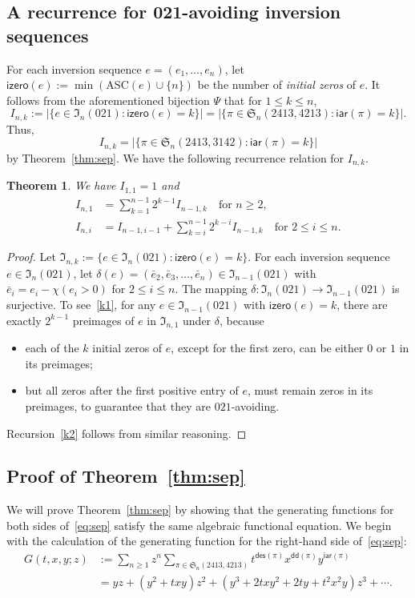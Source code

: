 \documentclass[12pt]{amsart}
\numberwithin{equation}{section}
\theoremstyle{plain}
\newtheorem{theorem}{Theorem}[section]
\theoremstyle{definition}
\newcommand{\I}{\mathfrak{I}}
\def\des{\mathsf{des}}
\def\S{\mathfrak{S}}
\def\iar{\mathsf{iar}}
\def\ASC{\mathrm{ASC}}
\def\dd{\mathsf{dd}}
\def\izero{\mathsf{izero}}
\begin{document}
\subsection{A recurrence for 021-avoiding inversion sequences}
\label{sec:021}
For each inversion sequence $e=(e_1,\ldots,e_n)$, let $\izero(e):=\min(\ASC(e)\cup\{n\})$ be the number of {\em initial zeros} of $e$. It follows from the aforementioned bijection $\Psi$ that for $1\leq k\leq n$,
\begin{equation}
I_{n,k}:=|\{e\in\I_n(021):\izero(e)=k\}|=|\{\pi\in\S_n(2413,4213):\iar(\pi)=k\}|.
\end{equation}
Thus, 
$$
I_{n,k}=|\{\pi\in\S_n(2413,3142):\iar(\pi)=k\}|
$$
by Theorem~\ref{thm:sep}. 
We have the following recurrence relation for $I_{n,k}$. 
\begin{theorem} \label{rec:021}We have $I_{1,1}=1$ and 
\begin{align}
\label{k1}I_{n,1}&=\sum_{k=1}^{n-1}2^{k-1}I_{n-1,k}\quad\text{for $n\geq2$},\\
\label{k2}I_{n,i}&=I_{n-1,i-1}+\sum_{k=i}^{n-1}2^{k-i}I_{n-1,k}\quad\text{for $2\leq i \leq n$}.
\end{align}
\end{theorem}
\begin{proof}
Let $\I_{n,k}:=\{e\in\I_n(021):\izero(e)=k\}$.
For each inversion sequence $e\in\I_n(021)$, let $\delta(e)=(\bar e_2,\bar e_3,\ldots,\bar e_n)\in\I_{n-1}(021)$ with $\bar e_i=e_i-\chi(e_i>0)$ for $2\leq i\leq n$. The mapping $\delta:\I_n(021)\rightarrow\I_{n-1}(021)$ is surjective. To see~\eqref{k1}, for any $e\in\I_{n-1}(021)$ with $\izero(e)=k$, there are exactly $2^{k-1}$ preimages of $e$ in $\I_{n,1}$ under $\delta$, because 
\begin{itemize}
\item each of the $k$ initial zeros of $e$, except for the first zero, can be either $0$ or $1$ in its preimages;
\item but all zeros after the first positive entry of $e$, must remain zeros in its preimages, to guarantee that they are $021$-avoiding. 
\end{itemize}
Recursion~\eqref{k2} follows from similar reasoning. 
\end{proof}

 

\subsection{Proof of Theorem~\ref{thm:sep}} We will prove Theorem~\ref{thm:sep} by showing that the generating functions for both sides of~\eqref{eq:sep} satisfy the same algebraic functional equation. We begin with the calculation of the generating function for the right-hand side of~\eqref{eq:sep}:
\begin{align*}
G(t,x,y;z)&:=\sum_{n\geq1}z^n\sum_{\pi\in\S_n(2413,4213)}t^{\des(\pi)}x^{\dd(\pi)}y^{\iar(\pi)}\\
&=yz+(y^2+txy)z^2+(y^3+2txy^2+2ty+t^2x^2y)z^3+\cdots.
\end{align*}
\end{document}
